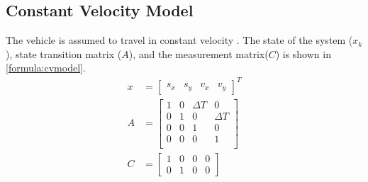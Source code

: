\subsection{Constant Velocity Model}
The vehicle is assumed to travel in constant velocity \cite{Schubert2008}. The state of the system ($x_k$), state transition matrix ($A$), and the measurement matrix($C$) is shown in \eqref{formula:cvmodel}.
\begin{equation*}
\label{formula:cvmodel}
\begin{split}
x &=
\left[\begin{matrix}
s_x & s_y & v_x & v_y
\end{matrix}\right]^{T}\\
A&= \left[\begin{matrix}
1 & 0 & \Delta T & 0\\
0 & 1 & 0 & \Delta T\\
0 & 0 & 1 & 0\\
0 & 0 & 0 & 1\\
\end{matrix}\right]\\
C&= \left[\begin{matrix}
1 & 0 & 0 & 0\\
0 & 1 & 0 & 0
\end{matrix}\right]
\end{split}
\end{equation*}

